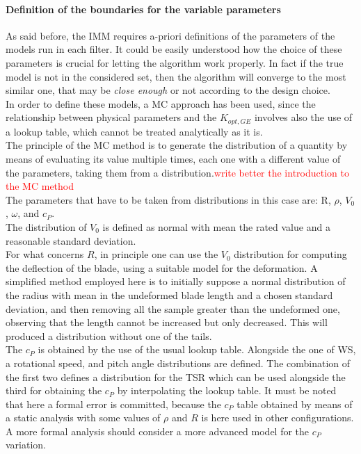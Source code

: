 \paragraph{Definition of the boundaries for the variable parameters}
As said before, the IMM requires a-priori definitions of the parameters of the models run in each filter. It could be easily understood how the choice of these parameters is crucial for letting the algorithm work properly. In fact if the true model is not in the considered set, then the algorithm will converge to the most similar one, that may be \textit{close enough} or not according to the design choice.\\ 
In order to define these models, a \acrfull{MC} approach has been used, since the relationship between physical parameters and the $K_{opt,GE}$ involves also the use of a lookup table, which cannot be treated analytically as it is.\\
The principle of the \acrshort{MC} method is to generate the distribution of a quantity by means of evaluating its value multiple times, each one with a different value of the parameters, taking them from a distribution.\textcolor{red}{write better the introduction to the \acrshort{MC} method}\\
The parameters that have to be taken from distributions in this case are: R, $\rho$, $V_0$, $\omega$, and $c_P$.\\
The distribution of $V_0$ is defined as normal with mean the rated value and a reasonable standard deviation. \\
For what concerns $R$, in principle one can use the $V_0$ distribution for computing the deflection of the blade, using a suitable model for the deformation. A simplified method employed here is to initially suppose a normal distribution of the radius with mean in the undeformed blade length and a chosen standard deviation, and then removing all the sample greater than the undeformed one, observing that the length cannot be increased but only decreased. This will produced a distribution without one of the tails. \\
The $c_P$ is obtained by the use of the usual lookup table. Alongside the one of WS, a rotational speed, and pitch angle distributions are defined. The combination of the first two defines a distribution for the TSR which can be used alongside the third for obtaining the $c_P$ by interpolating the lookup table. It must be noted that here a formal error is committed, because the $c_P$ table obtained by means of a static analysis with some values of $\rho$ and $R$ is here used in other configurations. A more formal analysis should consider a more advanced model for the $c_P$ variation. 

